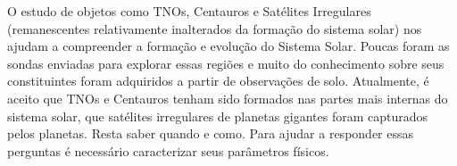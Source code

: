 \documentclass[12pt,a4paper]{monografia}
\begin{document}
\doutorado


\maketitle



\indent \indent O estudo de objetos como TNOs, Centauros e Satélites Irregulares (remanescentes relativamente inalterados da formação do sistema solar) nos ajudam a compreender a formação e evolução do Sistema Solar. Poucas foram as sondas enviadas para explorar essas regiões e muito do conhecimento sobre seus constituintes foram adquiridos a partir de observações de solo. Atualmente, é aceito que TNOs e Centauros tenham sido formados nas partes mais internas do sistema solar, que satélites irregulares de planetas gigantes foram capturados pelos planetas. Resta saber quando e como. Para ajudar a responder essas perguntas é necessário caracterizar seus parâmetros físicos.
\end{document}
